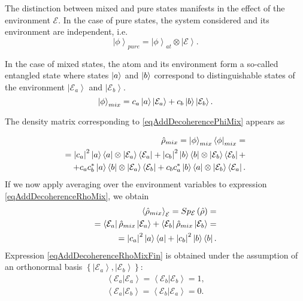 The distinction between mixed and pure states manifests in the effect of the environment $\mathcal{E}$. In the case of pure states, the system considered and its environment are independent, i.e.
\begin{equation}
\left|\phi\right>_{pure} = \left|\phi\right>_{at} \otimes
\left|\mathcal{E}\right>.
\label{eqAddDecoherencePhiPure}
\end{equation}

In the case of mixed states, the atom and its environment form a so-called entangled state where states $\ket{a}$ and $\ket{b}$ correspond to distinguishable states of the environment $\left|\mathcal{E}_a\right>$ and $\left|\mathcal{E}_b\right>$.
\begin{equation}
\left|\phi\right>_{mix} = c_a\ket{a} \left|\mathcal{E}_a\right>
+ c_b\ket{b} \left|\mathcal{E}_b\right>.
\label{eqAddDecoherencePhiMix}
\end{equation}

The density matrix 
corresponding to \eqref{eqAddDecoherencePhiMix} appears as

\begin{eqnarray}
\hat{\rho}_{mix} = \left|\phi\right>_{mix}\left<\phi\right|_{mix} = 
\nonumber \\
= 
\left|c_a\right|^2 \ket{a}\bra{a} \otimes
\left|\mathcal{E}_a\right>\left<\mathcal{E}_a\right| + 
\left|c_b\right|^2 \ket{b}\bra{b} \otimes
\left|\mathcal{E}_b\right>\left<\mathcal{E}_b\right| +
\nonumber \\
+
c_a c_b^{\ast}\ket{a}\bra{b} \otimes
\left|\mathcal{E}_a\right>\left<\mathcal{E}_b\right| +
c_b c_a^{\ast}\ket{b}\bra{a} \otimes
\left|\mathcal{E}_b\right>\left<\mathcal{E}_a\right|.
\label{eqAddDecoherenceRhoMix}
\end{eqnarray}
If we now apply averaging over the environment variables to expression \eqref{eqAddDecoherenceRhoMix}, we obtain
\begin{eqnarray}
\left<\hat{\rho}_{mix}\right>_{\mathcal{E}} = 
Sp_{\mathcal{E}}\left(\hat{\rho}\right) = 
\nonumber \\
=
\left<\mathcal{E}_a\right|\hat{\rho}_{mix}\left|\mathcal{E}_a\right> +
\left<\mathcal{E}_b\right|\hat{\rho}_{mix}\left|\mathcal{E}_b\right>
= 
\nonumber \\
= \left|c_a\right|^2 \ket{a}\bra{a} + 
\left|c_b\right|^2 \ket{b}\bra{b}.
\label{eqAddDecoherenceRhoMixFin}
\end{eqnarray}
Expression \eqref{eqAddDecoherenceRhoMixFin} is obtained under the assumption of an orthonormal basis $\left\{\left|\mathcal{E}_a\right>, \left|\mathcal{E}_b\right>\right\}$: 
\begin{eqnarray}
\left<\mathcal{E}_a\right.\left|\mathcal{E}_a\right> = 
\left<\mathcal{E}_b\right.\left|\mathcal{E}_b\right> = 1,
\nonumber \\
\left<\mathcal{E}_a\right.\left|\mathcal{E}_b\right> = 
\left<\mathcal{E}_b\right.\left|\mathcal{E}_a\right> = 0.
\label{eqAddDecoherenceMixECond}
\end{eqnarray}

